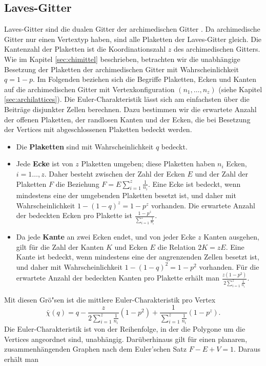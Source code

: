 \subsection{Laves-Gitter}
Laves-Gitter sind die dualen Gitter der archimedischen Gitter \cite{Gruenbaum:86}. Da archimedische Gitter nur einen Vertextyp haben, sind alle Plaketten der Laves-Gitter gleich. Die Kantenzahl der Plaketten ist die Koordinationszahl $z$ des archimedischen Gitters. Wie im Kapitel \ref{sec:chimittel} beschrieben, betrachten wir die unabh\"angige Besetzung der Plaketten der archimedischen Gitter mit Wahrscheinlichkeit $q=1-p$. Im Folgenden beziehen sich die Begriffe Plaketten, Ecken und Kanten auf die archimedischen Gitter mit Vertexkonfiguration $(n_1,\ldots,n_z)$ (siehe Kapitel \ref{sec:archilattices}). Die Euler-Charakteristik l\"asst sich am einfachsten \"uber die Beitr\"age disjunkter Zellen berechnen. Dazu bestimmen wir die erwartete Anzahl der offenen Plaketten, der randlosen Kanten und der Ecken, die bei Besetzung der Vertices mit abgeschlossenen Plaketten bedeckt werden.
\begin{itemize}
\item Die \textbf{Plaketten} sind mit Wahrscheinlichkeit $q$ bedeckt.
\item Jede \textbf{Ecke} ist von $z$ Plaketten umgeben; diese Plaketten haben $n_i$ Ecken, $i=1\ldots,z$. Daher besteht zwischen der Zahl der Ecken $E$ und der Zahl der Plaketten $F$ die Beziehung  $F=E \sum_{i=1}^z \frac{1}{n_i}$. Eine Ecke ist bedeckt, wenn mindestens eine der umgebenden Plaketten besetzt ist, und daher mit Wahrscheinlichkeit $1-(1-q)^z=1-p^z$ vorhanden. Die erwartete Anzahl der bedeckten Ecken pro Plakette ist $\frac{1-p^z}{\sum_{i=1}^z \frac{1}{n_i}}$.
\item Da jede \textbf{Kante} an zwei Ecken endet, und von jeder Ecke $z$ Kanten ausgehen, gilt f\"ur die Zahl der Kanten $K$ und Ecken $E$ die Relation $2K=zE$. Eine Kante ist bedeckt, wenn mindestens eine der angrenzenden Zellen besetzt ist, und daher mit Wahrscheinlichkeit $1-(1-q)^2=1-p^2$ vorhanden. F\"ur die erwartete Anzahl der bedeckten Kanten pro Plakette erh\"alt man $\frac{z(1-p^2)}{2\sum_{i=1}^z \frac{1}{n_i}}$.
\end{itemize}
Mit diesen Gr\"o"sen ist die mittlere Euler-Charakteristik pro Vertex 
\begin{equation}
    \bar{\chi}(q) = q- \frac{z}{2 \sum_{i=1}^z \frac{1}{n_i}}(1-p^2)+\frac{1}{\sum_{i=1}^z \frac{1}{n_i}}(1-p^z).
\end{equation}
Die Euler-Charakteristik ist von der Reihenfolge, in der die Polygone um die Vertices angeordnet sind, unabh\"angig. Dar\"uberhinaus gilt f\"ur einen planaren, zusammenh\"angenden Graphen nach dem Euler'schen Satz $F-E+V=1$. Daraus erh\"alt man
